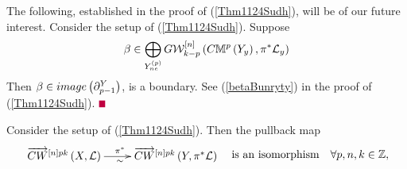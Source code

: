\documentclass[12pt]{article}
\begin{document}
\vspace{3mm} 
The following, established in the proof of  (\ref{Thm1124Sudh}), will be of our future interest. 
\bC\label{Amnii}{\rm 
Consider the setup of (\ref{Thm1124Sudh}).
Suppose 
$$
\beta\in \bigoplus_{Y^{\left( p\right)}_{ne}}G{\mathcal{W}}_{k-p}^{\left[ n\right]}\left( C{\mathbb{M}}^{p}\left( Y_y\right), \pi^*{\mathcal{L}}_y\right)
$$
 Then $\beta
\in image\left( \partial^Y_{p-1}\right)$, is a boundary.
}
\eC
\pf See (\ref{betaBunryty}) in the  proof of  (\ref{Thm1124Sudh}). $\eop$ 

\vspace{3mm}
\bT%
\label{CorFus1126}
{\rm 
Consider the setup of (\ref{Thm1124Sudh}). Then the pullback map
$$
\diagram 
\ora{CW}^{\LRt{n}pk} \LRf{X, {\CL}} \ar[r]^{\pi^*}_{\sim}& \ora{CW}^{\LRt{n}pk}\LRf{Y, \pi^*{\CL}} \\
\enddiagram \quad
{\rm is ~an~ isomorphism}\quad \forall p, n, k\in {\BZ}, 
$$
}
\eT
\end{document}
